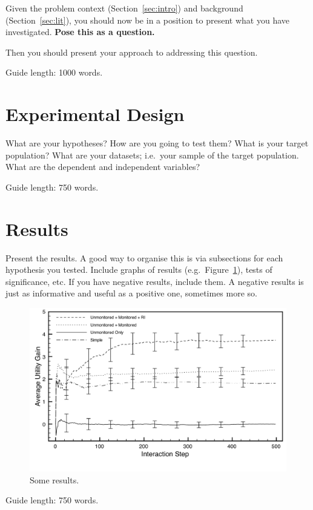 \documentclass{csfourzero}
\begin{document}
Given the problem context (Section~\ref{sec:intro}) and background
(Section~\ref{sec:lit}), you should now be in a position to present
what you have investigated. \textbf{Pose this as a question.}

Then you should present your approach to addressing this
question.

Guide length: 1000 words.

\section{Experimental Design}
\label{sec:exp}

What are your hypotheses? How are you going to test them? What is your
target population? What are your datasets; i.e.\ your sample of the
target population. What are the dependent and independent variables?

Guide length: 750 words.

\section{Results}
\label{sec:results}

Present the results. A good way to organise this is via subsections
for each hypothesis you tested. Include graphs of results
(e.g.\ Figure~\ref{fig:data}), tests of significance, etc. If you have
negative results, include them. A negative results is just as
informative and useful as a positive one, sometimes more so.

\begin{figure}
\centerline{\includegraphics[width=5in]{basic-data-errors}}
\caption{Some results.}\label{fig:data}
\end{figure}

Guide length: 750 words.
\end{document}
